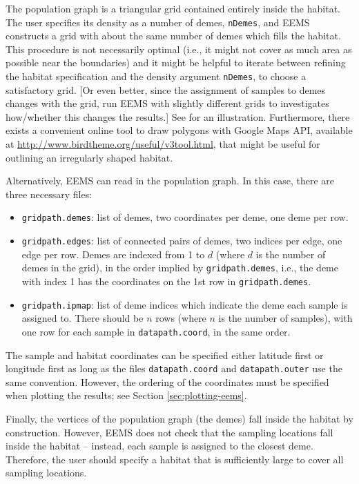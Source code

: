 \documentclass[a4paper,10pt,DIV=15,titlepage,mpinclude=true]{scrartcl}
\newcommand{\keystring}[1]{{\tt #1}}
\begin{document}
The population graph is a triangular grid contained entirely inside the habitat. The user specifies its density as a number of demes, \keystring{nDemes}, and EEMS constructs a grid with about the same number of demes which fills the habitat. This procedure is not necessarily optimal (i.e., it might not cover as much area as possible near the boundaries) and it might be helpful to iterate between refining the habitat specification and the density argument \keystring{nDemes}, to choose a satisfactory grid. [Or even better, since the assignment of samples to demes changes with the grid, run EEMS with slightly different grids to investigates how/whether this changes the results.] See  for an illustration. Furthermore, there exists a convenient online tool to draw polygons with Google Maps API, available at \url{http://www.birdtheme.org/useful/v3tool.html}, that might be useful for outlining an irregularly shaped habitat.

Alternatively, EEMS can read in the population graph. In this case, there are three necessary files:
\begin{itemize}
  \item \keystring{gridpath.demes}: list of demes, two coordinates per deme, one deme per row.
  \item \keystring{gridpath.edges}: list of connected pairs of demes, two indices per edge, one edge per row. Demes are indexed from 1 to $d$ (where $d$ is the number of demes in the grid), in the order implied by \keystring{gridpath.demes}, i.e., the deme with index 1 has the coordinates on the 1st row in \keystring{gridpath.demes}.
  \item \keystring{gridpath.ipmap}: list of deme indices which indicate the deme each sample is assigned to. There should be $n$ rows (where $n$ is the number of samples), with one row for each sample in \keystring{datapath.coord}, in the same order.
\end{itemize}

The sample and habitat coordinates can be specified either latitude first or longitude first as long as the files \keystring{datapath.coord} and \keystring{datapath.outer} use the same convention. However, the ordering of the coordinates must be specified when plotting the results; see Section \ref{sec:plotting-eems}.

Finally, the vertices of the population graph (the demes) fall inside the habitat by construction. However, EEMS does not check that the sampling locations fall inside the habitat -- instead, each sample is assigned to the closest deme. Therefore, the user should specify a habitat that is sufficiently large to cover all sampling locations.
\end{document}

